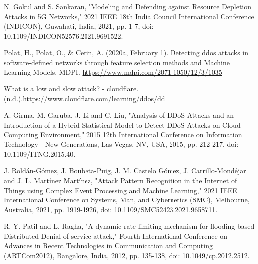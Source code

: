 \documentclass[conference]{IEEEtran}
\begin{document}
\begin{thebibliography}{00}
 N. Gokul and S. Sankaran, "Modeling and Defending against Resource Depletion Attacks in 5G Networks," 2021 IEEE 18th India Council International Conference (INDICON), Guwahati, India, 2021, pp. 1-7, doi: 10.1109/INDICON52576.2021.9691522.

 Polat, H., Polat, O., \& Cetin, A. (2020a, February 1). Detecting ddos attacks in software-defined networks through feature selection methods and Machine Learning Models. MDPI. \url{https://www.mdpi.com/2071-1050/12/3/1035}

 What is a low and slow attack? - cloudflare. (n.d.).\url{https://www.cloudflare.com/learning/ddos/dd}

A. Girma, M. Garuba, J. Li and C. Liu, "Analysis of DDoS Attacks and an Introduction of a Hybrid Statistical Model to Detect DDoS Attacks on Cloud Computing Environment," 2015 12th International Conference on Information Technology - New Generations, Las Vegas, NV, USA, 2015, pp. 212-217, doi: 10.1109/ITNG.2015.40.

J. Roldán-Gómez, J. Boubeta-Puig, J. M. Castelo Gómez, J. Carrillo-Mondéjar and J. L. Martínez Martínez, "Attack Pattern Recognition in the Internet of Things using Complex Event Processing and Machine Learning," 2021 IEEE International Conference on Systems, Man, and Cybernetics (SMC), Melbourne, Australia, 2021, pp. 1919-1926, doi: 10.1109/SMC52423.2021.9658711.

R. Y. Patil and L. Ragha, "A dynamic rate limiting mechanism for flooding based Distributed Denial of service attack," Fourth International Conference on Advances in Recent Technologies in Communication and Computing (ARTCom2012), Bangalore, India, 2012, pp. 135-138, doi: 10.1049/cp.2012.2512.



\end{thebibliography}
\vspace{12pt}
\end{document}
